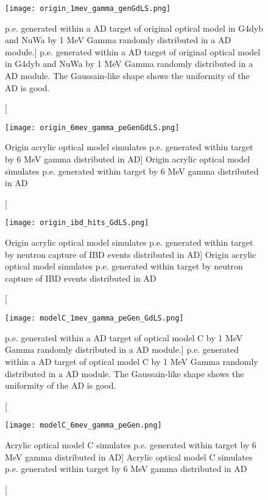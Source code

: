 \begin{figure}
    \centering
    \label{fig:origin_1mev_gamma_genGdLS.png}
    \texttt{[image: origin\_1mev\_gamma\_genGdLS.png]}
    \caption
[p.e. generated within a AD target of original optical model in G4dyb and NuWa by 1 MeV Gamma randomly distributed in a AD module.]
{p.e. generated within a AD target of original optical model in G4dyb and NuWa by 1 MeV Gamma randomly distributed in a AD module. The Gaussain-like shape shows the uniformity of the AD is good.}
    \end{figure}


\begin{figure}
    \centering
    \texttt{[image: origin\_6mev\_gamma\_peGenGdLS.png]}
    \caption
    [Origin acrylic optical model simulates p.e. generated within target by 6 MeV gamma distributed in AD]
    {Origin acrylic optical model simulates p.e. generated within target by 6 MeV gamma distributed in AD}
    \label{fig:origin_6mev_gamma_peGenGdLS.png}
    \end{figure}


\begin{figure}
    \centering
    \texttt{[image: origin\_ibd\_hits\_GdLS.png]}
    \caption
    [Origin acrylic optical model simulates p.e. generated within target by neutron capture of IBD events distributed in AD]
    {Origin acrylic optical model simulates p.e. generated within target by neutron capture of IBD events distributed in AD}
    \label{fig:origin_6mev_gamma_peGenGdLS.png}
    \end{figure}

\begin{figure}
    \centering
    \label{fig:modelC_1mev_gamma_peGen_GdLS.png}
    \texttt{[image: modelC\_1mev\_gamma\_peGen\_GdLS.png]}
    \caption
[p.e. generated within a AD target of optical model C by 1 MeV Gamma randomly distributed in a AD module.]
{p.e. generated within a AD target of optical model C by 1 MeV Gamma randomly distributed in a AD module. The Gaussain-like shape shows the uniformity of the AD is good.}
    \end{figure}

\begin{figure}
    \centering
    \texttt{[image: modelC\_6mev\_gamma\_peGen.png]}
    \caption
    [Acrylic optical model C simulates p.e. generated within target by 6 MeV gamma distributed in AD]
    {Acrylic optical model C simulates p.e. generated within target by 6 MeV gamma distributed in AD}
    \label{fig:modelC_6mev_gamma_peGen.png}
    \end{figure}



